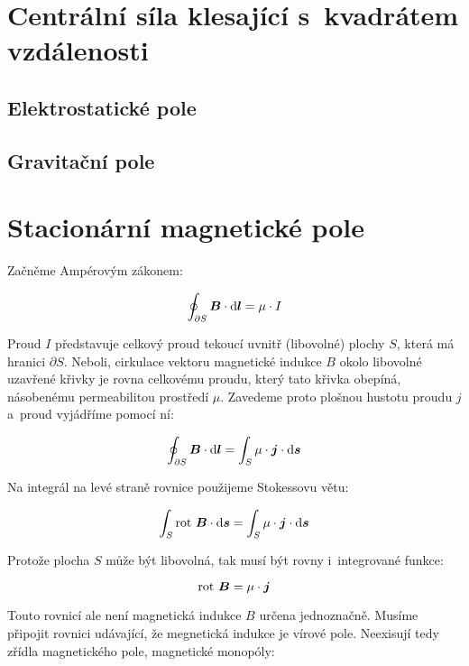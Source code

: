 \section{Centrální síla klesající s~kvadrátem vzdálenosti}

\subsection{Elektrostatické pole}
\subsection{Gravitační pole}

\section{Stacionární magnetické pole}

Začněme Ampérovým zákonem:

\begin{equation}
\oint_{\partial S} \boldsymbol{B} \cdot \mathrm{d}\boldsymbol{l} = \mu \cdot I
\end{equation}

Proud \(I\) představuje celkový proud tekoucí uvnitř (libovolné) plochy \(S\), která má hranici \(\partial S\). Neboli, cirkulace vektoru magnetické indukce \(B\) okolo libovolné uzavřené křivky je rovna celkovému proudu, který tato křivka obepíná, násobenému permeabilitou prostředí \(\mu\). Zavedeme proto plošnou hustotu proudu \(j\) a~proud vyjádříme pomocí ní:

\begin{equation}
\oint_{\partial S} \boldsymbol{B} \cdot \mathrm{d}\boldsymbol{l} = \int_S \mu \cdot \boldsymbol{j} \cdot \mathrm{d}\boldsymbol{s}
\end{equation}

Na integrál na levé straně rovnice použijeme Stokessovu větu:

\begin{equation}
\int_{S} \mathrm{rot} \ \boldsymbol{B} \cdot \mathrm{d}\boldsymbol{s} = \int_S \mu \cdot \boldsymbol{j} \cdot \mathrm{d}\boldsymbol{s}
\end{equation}

Protože plocha \(S\) může být libovolná, tak musí být rovny i~integrované funkce:

\begin{equation}
\mathrm{rot} \ \boldsymbol{B} = \mu \cdot \boldsymbol{j}
\end{equation}

Touto rovnicí ale není magnetická indukce \(B\) určena jednoznačně. Musíme připojit rovnici udávající, že megnetická indukce je vírové pole. Neexisují tedy zřídla magnetického pole, magnetické monopóly:

